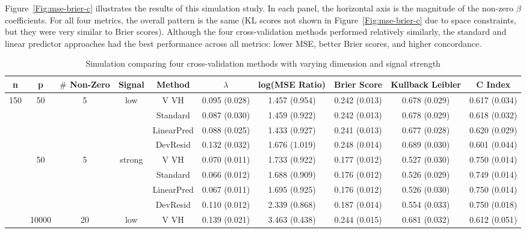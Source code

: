 \par Figure~\ref{Fig:mse-brier-c} illustrates the results of this simulation study. In each panel, the horizontal axis is the magnitude of the non-zero $\beta$ coefficients.  For all four metrics, the overall pattern is the same (KL scores not shown in Figure~\ref{Fig:mse-brier-c} due to space constraints, but they were very similar to Brier scores).  Although the four cross-validation methods performed relatively similarly, the standard and linear predictor approaches had the best performance across all metrics: lower MSE, better Brier scores, and higher concordance.
 
\begin{table}[htb]

\setlength{\tabcolsep}{3pt}

\caption{\label{Tab:sim} Simulation comparing four cross-validation methods with varying dimension and signal strength}
\centering
\begin{tabular}[t]{cccccccccc}
\toprule
 n& p& $\#$ Non-Zero & Signal & Method & $\lambda$ & log(MSE Ratio) &Brier Score & Kullback Leibler & C Index\\
\midrule
150 & 50 & 5 & low & V VH  & 0.095 (0.028) & 1.457 (0.954) & 0.242 (0.013) & 0.678 (0.029) & 0.617 (0.034) \\
    &    &   &     & Standard  & 0.087 (0.030) & 1.459 (0.922) & 0.242 (0.013) & 0.678 (0.029) & 0.618 (0.032) \\
    &    &   &     & LinearPred  & 0.088 (0.025) & 1.433 (0.927) & 0.241 (0.013) & 0.677 (0.028) & 0.620 (0.029) \\
    &    &   &     & DevResid  & 0.132 (0.032) & 1.676 (1.019) & 0.248 (0.014) & 0.689 (0.030) & 0.601 (0.044) \\
\addlinespace
150 & 50 & 5 & strong & V VH  & 0.070 (0.011) & 1.733 (0.922) & 0.177 (0.012) & 0.527 (0.030) & 0.750 (0.014) \\
    &    &   &     & Standard  & 0.066 (0.012) & 1.688 (0.909) & 0.176 (0.012) & 0.526 (0.029) & 0.749 (0.014) \\
    &    &   &     & LinearPred  & 0.067 (0.011) & 1.695 (0.925) & 0.176 (0.012) & 0.526 (0.030) & 0.750 (0.014) \\
    &    &   &     & DevResid  & 0.110 (0.012) & 2.339 (0.868) & 0.187 (0.014) & 0.554 (0.033) & 0.750 (0.018) \\
\addlinespace
300 & 10000 & 20 & low & V VH  & 0.139 (0.021) & 3.463 (0.438) & 0.244 (0.015) & 0.681 (0.032) & 0.612 (0.051) \\

\end{tabular}
\end{table}
